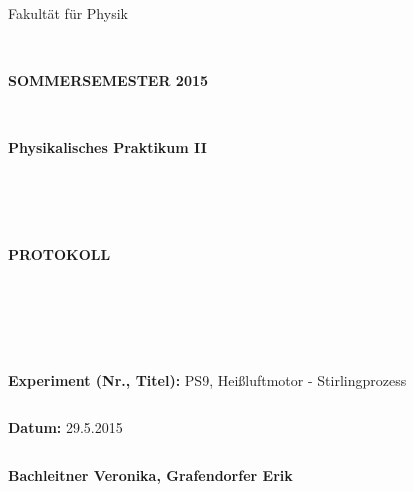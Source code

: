 \documentclass[12pt,a4paper,twopage]{article}
\begin{document}
\thispagestyle{empty}
			\begin{center}
			\Large{Fakultät für Physik}\\
			\end{center}
\begin{verbatim}


\end{verbatim}
			\begin{center}
			\textbf{\LARGE SOMMERSEMESTER 2015}
			\end{center}
\begin{verbatim}


\end{verbatim}
			\begin{center}
			\textbf{\LARGE{Physikalisches Praktikum II}}
			\end{center}
\begin{verbatim}




\end{verbatim}

			\begin{center}
			\textbf{\LARGE{PROTOKOLL}}
			\end{center}
			
\begin{verbatim}





\end{verbatim}

			\begin{flushleft}
			\Large{\textbf{Experiment (Nr., Titel):} PS9, Heißluftmotor - Stirlingprozess}\\
			
			\LARGE{}	
			\end{flushleft}

\begin{verbatim}

\end{verbatim}	
			\begin{flushleft}
			\textbf{\Large{Datum:}} \Large{29.5.2015}
			\end{flushleft}
			
\begin{verbatim}
\end{verbatim}
		\begin{flushleft}
			\textbf{\Large{Bachleitner Veronika, Grafendorfer Erik}} 
			\end{flushleft}
\end{document}
